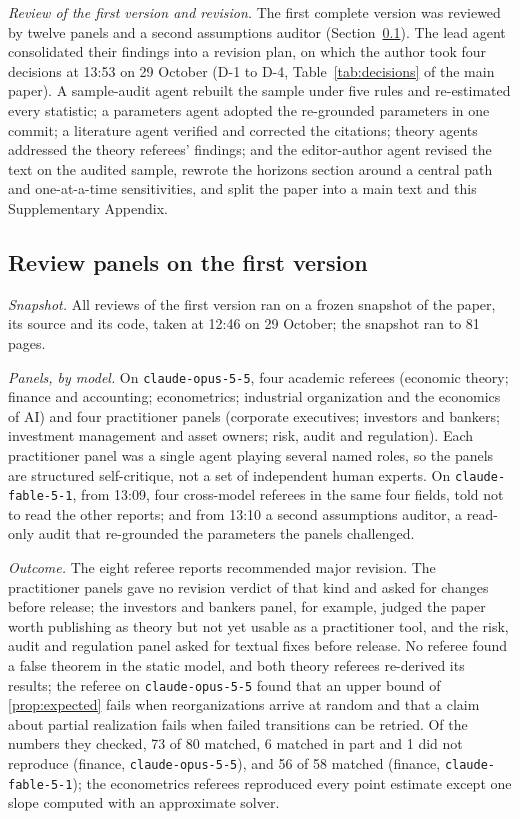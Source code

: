\emph{Review of the first version and revision.} The first complete version was reviewed by twelve panels and a second assumptions auditor (Section~\ref{app:protocol-panels}). The lead agent consolidated their findings into a revision plan, on which the author took four decisions at 13:53 on 29 October (D-1 to D-4, Table~\ref{tab:decisions} of the main paper). A sample-audit agent rebuilt the sample under five rules and re-estimated every statistic; a parameters agent adopted the re-grounded parameters in one commit; a literature agent verified and corrected the citations; theory agents addressed the theory referees' findings; and the editor-author agent revised the text on the audited sample, rewrote the horizons section around a central path and one-at-a-time sensitivities, and split the paper into a main text and this Supplementary Appendix.

\subsection{Review panels on the first version}\label{app:protocol-panels}
\emph{Snapshot.} All reviews of the first version ran on a frozen snapshot of the paper, its source and its code, taken at 12:46 on 29 October; the snapshot ran to 81 pages.

\emph{Panels, by model.} On \texttt{claude-opus-5-5}, four academic referees (economic theory; finance and accounting; econometrics; industrial organization and the economics of AI) and four practitioner panels (corporate executives; investors and bankers; investment management and asset owners; risk, audit and regulation). Each practitioner panel was a single agent playing several named roles, so the panels are structured self-critique, not a set of independent human experts. On \texttt{claude-fable-5-1}, from 13:09, four cross-model referees in the same four fields, told not to read the other reports; and from 13:10 a second assumptions auditor, a read-only audit that re-grounded the parameters the panels challenged.

\emph{Outcome.} The eight referee reports recommended major revision. The practitioner panels gave no revision verdict of that kind and asked for changes before release; the investors and bankers panel, for example, judged the paper worth publishing as theory but not yet usable as a practitioner tool, and the risk, audit and regulation panel asked for textual fixes before release. No referee found a false theorem in the static model, and both theory referees re-derived its results; the referee on \texttt{claude-opus-5-5} found that an upper bound of \autoref{prop:expected} fails when reorganizations arrive at random and that a claim about partial realization fails when failed transitions can be retried. Of the numbers they checked, 73 of 80 matched, 6 matched in part and 1 did not reproduce (finance, \texttt{claude-opus-5-5}), and 56 of 58 matched (finance, \texttt{claude-fable-5-1}); the econometrics referees reproduced every point estimate except one slope computed with an approximate solver.

